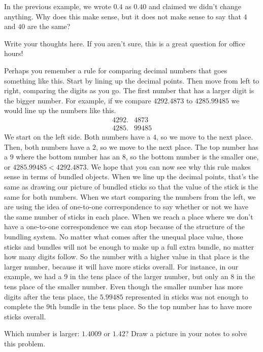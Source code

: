 \documentclass{ximera}
\begin{document}
\begin{question}
In the previous example, we wrote $0.4$ as $0.40$ and claimed we didn't change anything. Why does this make sense, but it does not make sense to say that $4$ and $40$ are the same?
\begin{freeResponse}
Write your thoughts here. If you aren't sure, this is a great question for office hours!
\end{freeResponse}
\end{question}

Perhaps you remember a rule for comparing decimal numbers that goes something like this. Start by lining up the decimal points. Then move from left to right, comparing the digits as you go. The first number that has a larger digit is the bigger number. For example, if we compare $4292.4873$ to $4285.99485$ we would line up the numbers like this.
\begin{align*}
4292.&4873\\
4285.&99485
\end{align*}
We start on the left side. Both numbers have a $4$, so we move to the next place. Then, both numbers have a $2$, so we move to the next place. The top number has a $9$ where the bottom number has an $8$, so the bottom number is the smaller one, or $4285.99485 < 4292.4873$. We hope that you can now see why this rule makes sense in terms of bundled objects. When we line up the decimal points, that's the same as drawing our picture of bundled sticks so that the value of the stick is the same for both numbers. When we start comparing the numbers from the left, we are using the idea of one-to-one correspondence to say whether or not we have the same number of sticks in each place. When we reach a place where we don't have a one-to-one correspondence we can stop because of the structure of the bundling system. No matter what comes after the unequal place value, those sticks and bundles will not be enough to make up a full extra bundle, no matter how many digits follow. So the number with a higher value in that place is the larger number, because it will have more sticks overall. For instance, in our example, we had a $9$ in the tens place of the larger number, but only an $8$ in the tens place of the smaller number. Even though the smaller number has more digits after the tens place, the $5.99485$ represented in sticks was not enough to complete the $9$th bundle in the tens place. So the top number has to have more sticks overall.

\begin{question}
Which number is larger: $1.4009$ or $1.42$? Draw a picture in your notes to solve this problem.

\begin{multipleChoice}
\end{multipleChoice}
\end{question}
\end{document}
